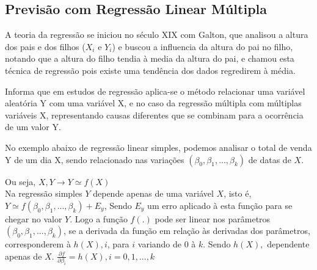 \documentclass[	12pt, Times, openright, twoside, a4paper, english, brazil]{abntex2}
\begin{document}
          \begin{figure}[H]
          \end{figure}

        \subsection{Previsão com Regressão Linear Múltipla}
          A teoria da regressão se iniciou no século XIX com Galton, que analisou a altura dos pais e dos filhos ($X_i$ e $Y_i$) e buscou a influencia da altura do pai no filho, notando que a altura do filho tendia à media da altura do pai, e chamou esta técnica de regressão pois existe uma tendência dos dados regredirem à média.

          \cite{Clarice2011} Informa que em estudos de regressão aplica-se o método relacionar uma variável aleatória Y com uma variável X, e no caso da regressão múltipla com múltiplas variáveis X, representando causas diferentes que se combinam para a ocorrência de um valor Y. 

          No exemplo abaixo de regressão linear simples, podemos analisar o total de venda Y de um dia X, sendo relacionado nas variações $(\beta_0, \beta_1, ..., \beta_k)$ de datas de $X$.

          Ou seja, $X,Y \rightarrow Y \simeq f(X) $\\
          Na regressão simples $Y$ depende apenas de uma variável $X$, isto é, $Y \simeq f(\beta_0, \beta_1, ..., \beta_k) + E_y$, Sendo $E_y$ um erro aplicado à esta função para se chegar no valor $Y$. Logo a função $f(.)$ pode ser linear nos parâmetros $(\beta_0, \beta_1, ..., \beta_k)$, se a derivada da função em relação às derivadas dos parâmetros, corresponderem à $h(X),i$, para $i$ variando de $0$ à $k$. Sendo $h(X),$ dependente apenas de $X$.
          $\frac {\partial f}{\partial \beta_i} = h (X),i = 0,1,...,k $
\end{document}
